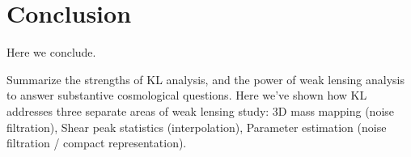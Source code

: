 \chapter{Conclusion}

Here we conclude.

Summarize the strengths of KL analysis, and the power of weak lensing
analysis to answer substantive cosmological questions.  Here we've shown
how KL addresses three separate areas of weak lensing study:
3D mass mapping (noise filtration), Shear peak statistics (interpolation),
Parameter estimation (noise filtration / compact representation).
